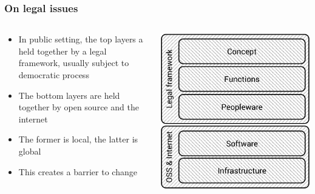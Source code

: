 \documentclass[10pt, compress]{beamer}
\begin{document}
\begin{frame}[fragile]
	\frametitle{On legal issues}
		\begin{columns}[T]
		\begin{column}{7.2cm}
			\begin{itemize}
				\item In public setting, the top layers a held together by a legal framework, usually subject to democratic process
				\item The bottom layers are held together by open source and the internet
				\item The former is local, the latter is global
				\item This creates a barrier to change
			\end{itemize}
		\end{column}
		\begin{column}[T]{3.8cm}
			\includegraphics[width=\textwidth]{govlayers_legal.pdf}
		\end{column}
	\end{columns}
\end{frame}
\end{document}
